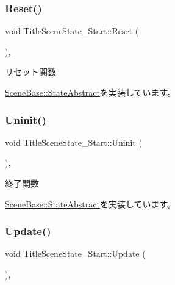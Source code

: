 \subsubsection{\texorpdfstring{Reset()}{Reset()}}
{\footnotesize\ttfamily void Title\+Scene\+State\+\_\+\+Start\+::\+Reset (\begin{DoxyParamCaption}{ }\end{DoxyParamCaption})\hspace{0.3cm}{\ttfamily [override]}, {\ttfamily [virtual]}}



リセット関数 



\mbox{\hyperlink{class_scene_base_1_1_state_abstract_a7e00d36fa023d91a0f205f12662584a0}{Scene\+Base\+::\+State\+Abstract}}を実装しています。

\mbox{\label{class_title_scene_state___start_a5bcb4d7a9250ea1c0041c38616ffabfe}} 
\subsubsection{\texorpdfstring{Uninit()}{Uninit()}}
{\footnotesize\ttfamily void Title\+Scene\+State\+\_\+\+Start\+::\+Uninit (\begin{DoxyParamCaption}{ }\end{DoxyParamCaption})\hspace{0.3cm}{\ttfamily [override]}, {\ttfamily [virtual]}}



終了関数 



\mbox{\hyperlink{class_scene_base_1_1_state_abstract_a7a92fbd3fd68177a4e807bf7c359641c}{Scene\+Base\+::\+State\+Abstract}}を実装しています。

\mbox{\label{class_title_scene_state___start_a2e98cf6810711b58766d7147168d02eb}} 
\subsubsection{\texorpdfstring{Update()}{Update()}}
{\footnotesize\ttfamily void Title\+Scene\+State\+\_\+\+Start\+::\+Update (\begin{DoxyParamCaption}{ }\end{DoxyParamCaption})\hspace{0.3cm}{\ttfamily [override]}, {\ttfamily [virtual]}}



